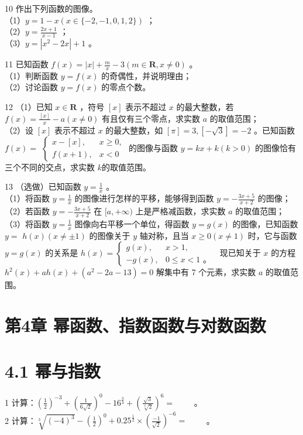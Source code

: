 \documentclass[10pt]{article}
\begin{document}
10 作出下列函数的图像。\\
（1）\(y=1-x(x \in\{-2,-1,0,1,2\})\) ；\\
（2）\(y=\frac{2 x+1}{x-1}\) ；\\
（3）\(y=\left|x^{2}-2 x\right|+1\) 。

11 已知函数 \(f(x)=|x|+\frac{m}{x}-3(m \in \mathbf{R}, x \neq 0)\) 。\\
（1）判断函数 \(y=f(x)\) 的奇偶性，并说明理由；\\
（2）讨论函数 \(y=f(x)\) 的零点个数。

12 （1）已知 \(x \in \mathbf{R}\) ，符号 \([x]\) 表示不超过 \(x\) 的最大整数，若 \(f(x)=\frac{[x]}{x}-a(x \neq 0)\) 有且仅有三个零点，求实数 \(a\) 的取值范围；\\
（2）设 \([x]\) 表示不超过 \(x\) 的最大整数，如 \([\pi]=3,[-\sqrt{3}]=-2\) 。已知函数 \(f(x)=\) \(\left\{\begin{array}{ll}x-[x], & x \geqslant 0, \\ f(x+1), & x<0\end{array}\right.\) 的图像与函数 \(y=k x+k(k>0)\) 的图像恰有三个不同的交点，求实数 \(k\)的取值范围。

13 （选做）已知函数 \(y=\frac{1}{x}\) 。\\
（1）将函数 \(y=\frac{1}{x}\) 的图像进行怎样的平移，能够得到函数 \(y=-\frac{3 x+5}{x+2}\) 的图像；\\
（2）若函数 \(y=-\frac{3 x+5}{x+2}\) 在 \([a,+\infty)\) 上是严格减函数，求实数 \(a\) 的取值范围；\\
（3）将函数 \(y=\frac{1}{x}\) 图像向右平移一个单位，得函数 \(y=g(x)\) 的图像，已知函数 \(y=\) \(h(x)(x \neq \pm 1)\) 的图像关于 \(y\) 轴对称，且当 \(x \geqslant 0(x \neq 1)\) 时，它与函数 \(y=g(x)\) 的关系是 \(h(x)=\left\{\begin{array}{ll}g(x), & x>1, \\ -g(x), & 0 \leqslant x<1 \text { 。 }\end{array}\right.\) 现已知关于 \(x\) 的方程 \(h^{2}(x)+a h(x)+\left(a^{2}-2 a-13\right)=0\) 解集中有 7 个元素，求实数 \(a\) 的取值范围。

\section*{第4章 幂函数、指数函数与对数函数}
\section*{4.1 幂与指数}
1 计算：\(\left(\frac{1}{2}\right)^{-3}+\left(\frac{1}{6 \sqrt{2}}\right)^{0}-16^{\frac{3}{4}}+\left(\frac{\sqrt{3}}{\sqrt[3]{2}}\right)^{6}=\) \(\qquad\)。\\
2 计算：\(\sqrt[3]{(-4)^{3}}-\left(\frac{1}{2}\right)^{0}+0.25^{\frac{1}{2}} \times\left(\frac{-1}{\sqrt{2}}\right)^{-6}=\) \(\qquad\)。
\end{document}
